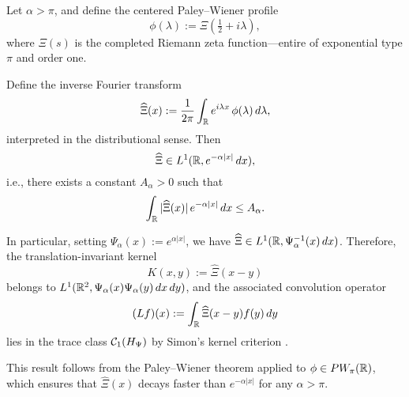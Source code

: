 \begin{lemma}
\label{lem:weighted_L1_inverse_FT_xi}
Let \( \alpha > \pi \), and define the centered Paley--Wiener profile
\[
\phi(\lambda) := \Xi\left( \tfrac{1}{2} + i\lambda \right),
\]
where \( \Xi(s) \) is the completed Riemann zeta function—entire of exponential type \( \pi \) and order one.

Define the inverse Fourier transform
\[
\widehat{\Xi}(x) := \frac{1}{2\pi} \int_{\mathbb{R}} e^{i\lambda x} \, \phi(\lambda)\, d\lambda,
\]
interpreted in the distributional sense. Then
\[
\widehat{\Xi} \in L^1(\mathbb{R}, e^{-\alpha |x|}\, dx),
\]
i.e., there exists a constant \( A_\alpha > 0 \) such that
\[
\int_{\mathbb{R}} |\widehat{\Xi}(x)| \, e^{-\alpha |x|}\, dx \le A_\alpha.
\]

In particular, setting \( \Psi_\alpha(x) := e^{\alpha |x|} \), we have \( \widehat{\Xi} \in L^1(\mathbb{R}, \Psi_\alpha^{-1}(x)\, dx) \). Therefore, the translation-invariant kernel
\[
K(x,y) := \widehat{\Xi}(x - y)
\]
belongs to \( L^1(\mathbb{R}^2, \Psi_\alpha(x)\Psi_\alpha(y)\, dx\,dy) \), and the associated convolution operator
\[
(L f)(x) := \int_{\mathbb{R}} \widehat{\Xi}(x - y) f(y)\, dy
\]
lies in the trace class \( \mathcal{C}_1(H_{\Psi}) \) by Simon’s kernel criterion \cite[Thm.~4.2]{Simon2005TraceIdeals}.

\medskip
\noindent
This result follows from the Paley--Wiener theorem applied to \( \phi \in PW_\pi(\mathbb{R}) \), which ensures that \( \widehat{\Xi}(x) \) decays faster than \( e^{-\alpha |x|} \) for any \( \alpha > \pi \).
\end{lemma}
